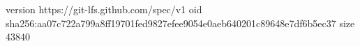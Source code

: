version https://git-lfs.github.com/spec/v1
oid sha256:aa07c722a799a8ff19701fed9827efee9054e0aeb640201c89648e7df6b5ec37
size 43840
